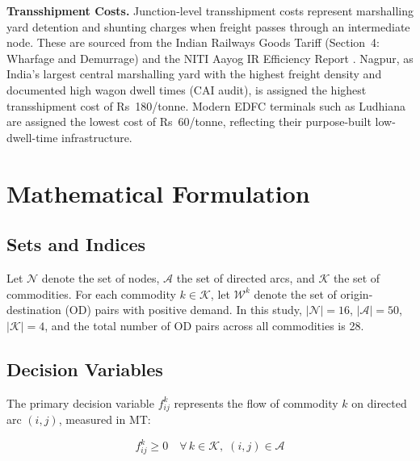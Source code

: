 \documentclass[11pt, a4paper]{article}
\numberwithin{equation}{section}
\numberwithin{figure}{section}
\numberwithin{table}{section}
\begin{document}
\textbf{Transshipment Costs.} Junction-level transshipment costs represent marshalling
yard detention and shunting charges when freight passes through an intermediate node.
These are sourced from the Indian Railways Goods Tariff (Section~4: Wharfage and
Demurrage) and the NITI Aayog IR Efficiency Report \cite{nitiayog2021}. Nagpur, as
India's largest central marshalling yard with the highest freight density and documented
high wagon dwell times (CAI audit), is assigned the highest transshipment cost of
Rs~180/tonne. Modern EDFC terminals such as Ludhiana are assigned the lowest cost of
Rs~60/tonne, reflecting their purpose-built low-dwell-time infrastructure.

\section{Mathematical Formulation}
\label{sec:formulation}

\subsection{Sets and Indices}

Let $\mathcal{N}$ denote the set of nodes, $\mathcal{A}$ the set of directed arcs,
and $\mathcal{K}$ the set of commodities. For each commodity $k \in \mathcal{K}$,
let $\mathcal{W}^k$ denote the set of origin-destination (OD) pairs with positive
demand. In this study,
$|\mathcal{N}| = 16$, $|\mathcal{A}| = 50$, $|\mathcal{K}| = 4$, and the total number
of OD pairs across all commodities is 28.

\subsection{Decision Variables}

The primary decision variable $f^k_{ij}$ represents the flow of commodity $k$ on
directed arc $(i,j)$, measured in MT:

\begin{equation}
    f^k_{ij} \geq 0 \quad \forall\, k \in \mathcal{K},\; (i,j) \in \mathcal{A}
\end{equation}
\end{document}
